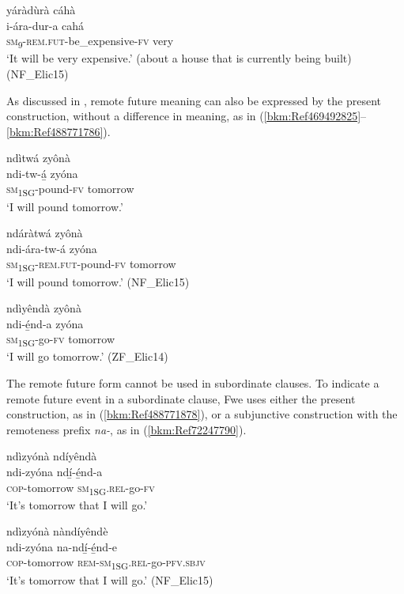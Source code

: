 \ea
\label{bkm:Ref506461735}
yáràdùrà cáhà\\
\gll i-ára-dur-a        cahá\\
\textsc{sm}\textsubscript{9}-\textsc{rem}.\textsc{fut}-be\_expensive-\textsc{fv}  very\\
\glt ‘It will be very expensive.’ (about a house that is currently being built) (NF\_Elic15)
\z

As discussed in , remote future meaning can also be expressed by the present construction, without a difference in meaning, as in (\ref{bkm:Ref469492825}--\ref{bkm:Ref488771786}).

\ea
\label{bkm:Ref469492825}
ndìtwá zyônà\\
\gll ndi-tw-á̲    zyóna\\
\textsc{sm}\textsubscript{1SG}-pound-\textsc{fv}  tomorrow\\
\glt ‘I will pound tomorrow.’
\z

\ea
ndáràtwá zyônà\\
\gll ndi-ára-tw-á      zyóna\\
\textsc{sm}\textsubscript{1SG}-\textsc{rem}.\textsc{fut}-pound-\textsc{fv}  tomorrow\\
\glt ‘I will pound tomorrow.’ (NF\_Elic15)
\z

\ea
\label{bkm:Ref488771786}
ndìyêndà zyônà\\
\gll ndi-é̲nd-a  zyóna\\
\textsc{sm}\textsubscript{1SG}-go-\textsc{fv}  tomorrow\\
\glt ‘I will go tomorrow.’ (ZF\_Elic14)
\z

The remote future form cannot be used in subordinate clauses. To indicate a remote future event in a subordinate clause, Fwe uses either the present construction, as in (\ref{bkm:Ref488771878}), or a subjunctive construction with the remoteness prefix \textit{na-}, as in (\ref{bkm:Ref72247790}).

\ea
\label{bkm:Ref488771878}
ndìzyónà ndíyêndà\\
\gll ndi-zyóna    ndí̲-é̲nd-a\\
\textsc{cop}-tomorrow  \textsc{sm}\textsubscript{1SG}.\textsc{rel}-go-\textsc{fv}\\
\glt ‘It’s tomorrow that I will go.’
\z

\ea
\label{bkm:Ref72247790}
ndìzyónà nàndíyêndè\\
\gll ndi-zyóna    na-ndí̲-é̲nd-e\\
\textsc{cop}-tomorrow  \textsc{rem}-\textsc{sm}\textsubscript{1SG}.\textsc{rel}-go-\textsc{pfv}.\textsc{sbjv}\\
\glt ‘It’s tomorrow that I will go.’ (NF\_Elic15)
\z

